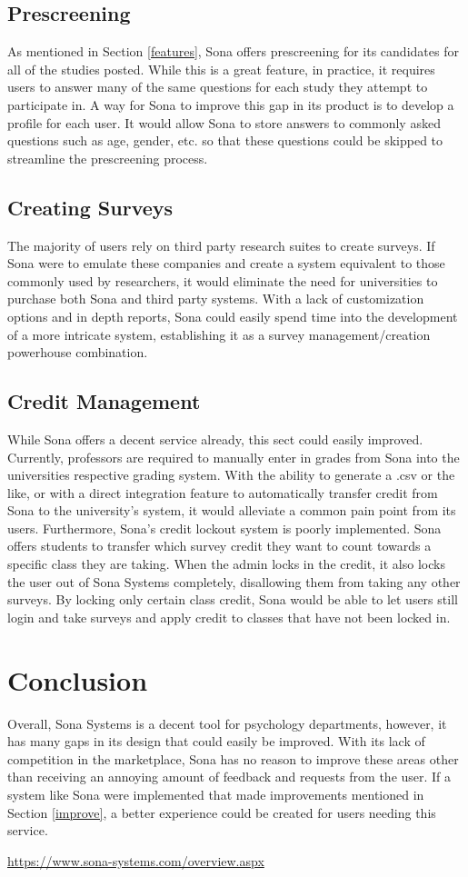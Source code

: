 \documentclass[12pt]{article}
\begin{document}
\subsection{Prescreening}
As mentioned in Section \ref{features}, Sona offers prescreening for its candidates for all of the studies posted. While this is a great feature, in practice, it requires users to answer many of the same questions for each study they attempt to participate in. A way for Sona to improve this gap in its product is to develop a profile for each user. It would allow Sona to store answers to commonly asked questions such as age, gender, etc. so that these questions could be skipped to streamline the prescreening process.

\subsection{Creating Surveys}
The majority of users rely on third party research suites to create surveys. If Sona were to emulate these companies and create a system equivalent to those commonly used by researchers, it would eliminate the need for universities to purchase both Sona and third party systems. With a lack of customization options and in depth reports, Sona could easily spend time into the development of a more intricate system, establishing it as a survey management/creation powerhouse combination.

\subsection{Credit Management}
While Sona offers a decent service already, this sect could easily improved. Currently, professors are required to manually enter in grades from Sona into the universities respective grading system. With the ability to generate a .csv or the like, or with a direct integration feature to automatically transfer credit from Sona to the university's system, it would alleviate a common pain point from its users. Furthermore, Sona's credit lockout system is poorly implemented. Sona offers students to transfer which survey credit they want to count towards a specific class they are taking. When the admin locks in the credit, it also locks the user out of Sona Systems completely, disallowing them from taking any other surveys. By locking only certain class credit, Sona would be able to let users still login and take surveys and apply credit to classes that have not been locked in.
\section{Conclusion}
Overall, Sona Systems is a decent tool for psychology departments, however, it has many gaps in its design that could easily be improved. With its lack of competition in the marketplace, Sona has no reason to improve these areas other than receiving an annoying amount of feedback and requests from the user. If a system like Sona were implemented that made improvements mentioned in Section \ref{improve}, a better experience could be created for users needing this service.
\begin{thebibliography}{9}
	\url{https://www.sona-systems.com/overview.aspx}
\end{thebibliography}
\end{document}
